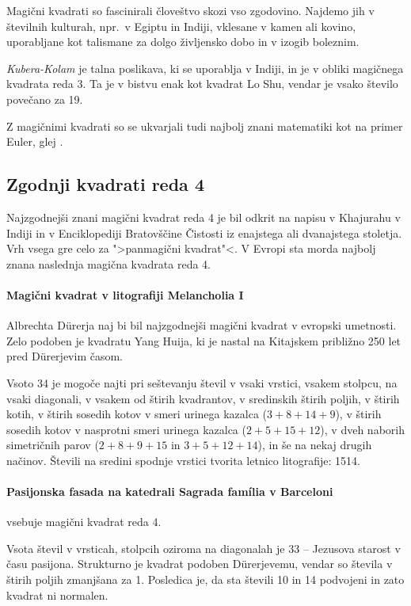 \documentclass[a4paper,12pt]{article}
\theoremstyle{definition}
\theoremstyle{plain}
\begin{document}
Magični kvadrati so fascinirali človeštvo skozi vso zgodovino. Najdemo jih
v številnih kulturah, npr.\ v Egiptu in Indiji, vklesane v kamen ali
kovino, uporabljane kot talismane za dolgo življensko dobo in v
izogib boleznim.

\emph{Kubera-Kolam} je talna poslikava, ki se uporablja v Indiji, in je v
obliki magičnega kvadrata reda 3. Ta je v bistvu enak kot kvadrat
Lo Shu, vendar je vsako število povečano za 19.

Z magičnimi kvadrati so se ukvarjali tudi najbolj znani matematiki kot na
primer Euler, glej \cite{euler}.


\subsection{Zgodnji kvadrati reda 4}

Najzgodnejši znani magični kvadrat reda 4 je bil odkrit na napisu
v Khajurahu v Indiji in v Enciklopediji Bratovščine Čistosti iz enajstega
ali dvanajstega stoletja. Vrh vsega gre celo za ">panmagični kvadrat"<.
V Evropi sta morda najbolj znana naslednja magična kvadrata reda 4.

\paragraph{Magični kvadrat v litografiji Melancholia I}
Albrechta Dürerja naj bi bil najzgodnejši magični kvadrat
v evropski umetnosti. Zelo podoben je kvadratu Yang Huija, ki je nastal na Kitajskem
približno 250 let pred Dürerjevim časom.

Vsoto 34 je mogoče najti pri seštevanju števil v vsaki vrstici, vsakem stolpcu,
na vsaki diagonali, v vsakem od štirih kvadrantov, v sredinskih štirih poljih,
v štirih kotih, v štirih sosedih kotov v smeri urinega kazalca (\(3+8+14+9\)), v
štirih sosedih kotov v nasprotni smeri urinega kazalca (\(2+5+15+12\)), v dveh naborih
simetričnih parov (\(2+8+9+15\) in \(3+5+12+14\)), in še na nekaj drugih načinov.
Števili na sredini spodnje vrstici tvorita letnico litografije: 1514.

\paragraph{Pasijonska fasada na katedrali Sagrada família v Barceloni}
vsebuje magični kvadrat reda 4.

Vsota števil v vrsticah, stolpcih oziroma na diagonalah je 33 -- Jezusova starost
v času pasijona. Strukturno je kvadrat podoben Dürerjevemu, vendar so števila
v štirih poljih zmanjšana za 1. Posledica je, da sta števili 10 in 14 podvojeni
in zato kvadrat ni normalen.
\end{document}
